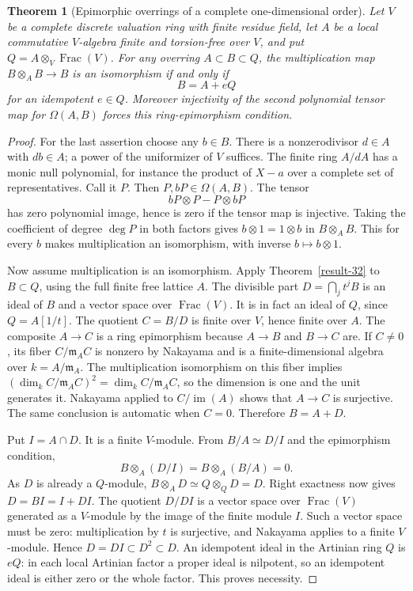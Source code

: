\documentclass[11pt,a4paper]{article}
\newtheorem{theorem}{Theorem}[section]
\theoremstyle{definition}
\begin{document}
\begin{theorem}[Epimorphic overrings of a complete one-dimensional order]\label{result-33}
Let $V$ be a complete discrete valuation ring with finite
residue field, let $A$ be a local commutative $V$-algebra
finite and torsion-free over $V$, and put
$Q=A\otimes_V\operatorname{Frac}(V)$.
For any overring $A\subset B\subset Q$, the multiplication
map $B\otimes_A B\to B$ is an isomorphism if and only if
\[
                            B=A+eQ
\]
for an idempotent $e\in Q$. Moreover injectivity of the
second polynomial tensor map for $\Omega(A,B)$ forces
this ring-epimorphism condition.
\end{theorem}
\begin{proof}
For the last assertion choose any $b\in B$. There is
a nonzerodivisor $d\in A$ with $db\in A$; a power
of the uniformizer of $V$ suffices. The finite ring
$A/dA$ has a monic null polynomial, for instance the
product of $X-a$ over a complete set of representatives.
Call it $P$. Then $P,bP\in\Omega(A,B)$. The tensor
\[
                       bP\otimes P-P\otimes bP
\]
has zero polynomial image, hence is zero if the tensor
map is injective. Taking the coefficient of degree
$\deg P$ in both factors gives
$b\otimes1=1\otimes b$ in $B\otimes_A B$.
This for every $b$ makes multiplication an isomorphism,
with inverse $b\mapsto b\otimes1$.

Now assume multiplication is an isomorphism.
Apply Theorem~\ref{result-32} to $B\subset Q$, using the full finite
free lattice $A$. The divisible part
$D=\bigcap_j t^jB$ is an ideal of $B$ and a vector
space over $\operatorname{Frac}(V)$. It is in fact
an ideal of $Q$, since $Q=A[1/t]$. The quotient
$C=B/D$ is finite over $V$, hence finite over $A$.
The composite $A\to C$ is a ring epimorphism because
$A\to B$ and $B\to C$ are. If $C\ne0$, its fiber
$C/\mathfrak m_A C$ is nonzero by Nakayama and is a
finite-dimensional algebra over $k=A/\mathfrak m_A$.
The multiplication isomorphism on this fiber implies
$(\dim_k C/\mathfrak m_A C)^2=\dim_k C/\mathfrak m_A C$,
so the dimension is one and the unit generates it.
Nakayama applied to $C/\operatorname{im}(A)$ shows
that $A\to C$ is surjective. The same conclusion is
automatic when $C=0$. Therefore $B=A+D$.

Put $I=A\cap D$. It is a finite $V$-module. From
$B/A\simeq D/I$ and the epimorphism condition,
\[
              B\otimes_A(D/I)=B\otimes_A(B/A)=0.
\]
As $D$ is already a $Q$-module,
$B\otimes_A D\simeq Q\otimes_QD=D$.
Right exactness now gives $D=BI=I+DI$.
The quotient $D/DI$ is a vector space over
$\operatorname{Frac}(V)$ generated as a $V$-module
by the image of the finite module $I$. Such a vector
space must be zero: multiplication by $t$ is
surjective, and Nakayama applies to a finite
$V$-module. Hence $D=DI\subset D^2\subset D$.
An idempotent ideal in the Artinian ring $Q$ is
$eQ$: in each local Artinian factor a proper ideal
is nilpotent, so an idempotent ideal is either zero
or the whole factor. This proves necessity.


\end{proof}
\end{document}
